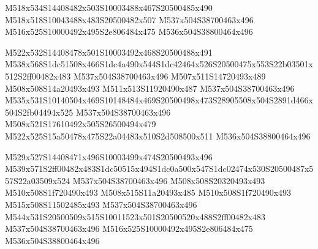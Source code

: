\documentclass{article}
\begin{document}
\begin{multicols}{5}
\begin{center}
M518x534S14408482x503S10003488x467S20500485x490 %
M518x518S10043488x483S20500482x507 %
M537x504S38700463x496 %
M516x525S10000492x495S2e806484x475 %
M536x504S38800464x496 %

M522x532S14408478x501S10003492x468S20500488x491 %
M538x568S1dc51508x466S1dc4a490x544S1dc42464x526S20500475x553S22b03501x512S2ff00482x483 %
M537x504S38700463x496 %
M507x511S14720493x489 %
M508x508S14a20493x493 %
M511x513S11920490x487 %
M537x504S38700463x496 %
M535x531S10140504x469S10148484x469S20500498x473S28905508x504S2891d466x504S2fb04494x525 %
M537x504S38700463x496 %
M508x521S17610492x505S26500494x479 %
M522x525S15a50478x475S22a04483x510S2d508500x511 %
M536x504S38800464x496

M529x527S14408471x496S10003499x474S20500493x496 %
M539x571S2ff00482x483S1dc50515x494S1dc0a500x547S1dc02474x530S20500487x557S22a03509x524 %
M537x504S38700463x496 %
M508x508S20320493x493 %
M510x508S1f720490x493 %
M508x515S11a20493x485 %
M510x508S1f720490x493 %
M515x508S11502485x493 %
M537x504S38700463x496 %
M544x531S20500509x515S10011523x501S20500520x488S2ff00482x483 %
M537x504S38700463x496 %
M516x525S10000492x495S2e806484x475 %
M536x504S38800464x496 %
\end{center}
\end{multicols}
\end{document}
